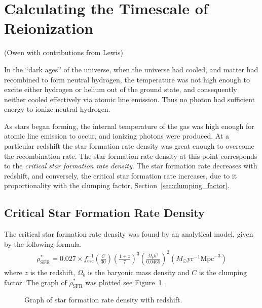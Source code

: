 
\newpage
\section{Calculating the Timescale of Reionization} %
\label{sec:calculating_the_timescale_of_reionization}
(Owen with contributions from Lewis)

	In the ``dark ages'' of the universe, when the universe had cooled, and matter had recombined to form neutral hydrogen, the temperature was not high enough to excite either hydrogen or helium out of the ground state, and consequently neither cooled effectively via atomic line emission. Thus no photon had sufficient energy to ionize neutral hydrogen.

	As stars began forming, the internal temperature of the gas was high enough for atomic line emission to occur, and ionizing photons were produced. At a particular redshift the star formation rate density was great enough to overcome the recombination rate. The star formation rate density at this point corresponds to the \emph{critical star formation rate density}. The star formation rate decreases with redshift, and conversely, the critical star formation rate increases, due to it proportionality with the clumping factor, Section~\ref{sec:clumping_factor}.

	\subsection{Critical Star Formation Rate Density} %
	\label{sub:critical_star_formation_rate_density}
		The critical star formation rate density was found by an analytical model, given by the following formula\cite{Pawlik:2009ij}.
		\begin{align}
			\rho^*_\text{SFR} = 0.027 \times f^{-1}_\text{esc} \left (\frac{C}{30} \right ) \left (\frac{1+z}{7} \right )^3 \left (\frac{\Omega_b h^2}{0.0465} \right )^2 (M_\odot \text{yr}^{-1} \text{Mpc}^{-3})
		\end{align}
		where $z$ is the redshift, $\Omega_b$ is the baryonic mass density and $C$ is the clumping factor. The graph of $\rho^*_\text{SFR}$ was plotted see Figure~\ref{fig:GRAPH_SFR_Density}.
		\begin{figure}[htbp]
			\centering
				\begingroup{}
					\resizebox{0.8\textwidth}{!}{%
						
					}\endgroup
			\caption{Graph of star formation rate density with redshift.\label{fig:GRAPH_SFR_Density}}
		\end{figure}

